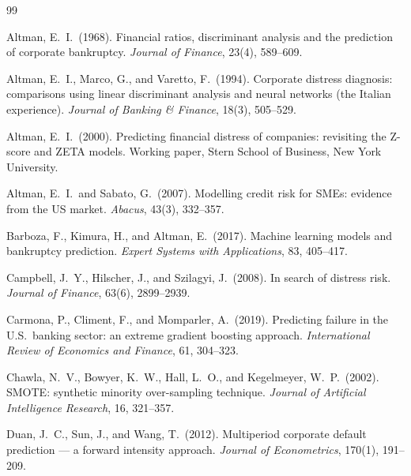 \documentclass[11pt,a4paper]{article}
\begin{document}

\begin{thebibliography}{99}

Altman, E.\ I.\ (1968).
\newblock Financial ratios, discriminant analysis and the prediction of
corporate bankruptcy.
\newblock \textit{Journal of Finance}, 23(4), 589--609.

Altman, E.\ I., Marco, G., and Varetto, F.\ (1994).
\newblock Corporate distress diagnosis: comparisons using linear discriminant
analysis and neural networks (the Italian experience).
\newblock \textit{Journal of Banking \& Finance}, 18(3), 505--529.

Altman, E.\ I.\ (2000).
\newblock Predicting financial distress of companies: revisiting the Z-score
and ZETA models.
\newblock Working paper, Stern School of Business, New York University.

Altman, E.\ I.\ and Sabato, G.\ (2007).
\newblock Modelling credit risk for SMEs: evidence from the US market.
\newblock \textit{Abacus}, 43(3), 332--357.

Barboza, F., Kimura, H., and Altman, E.\ (2017).
\newblock Machine learning models and bankruptcy prediction.
\newblock \textit{Expert Systems with Applications}, 83, 405--417.

Campbell, J.\ Y., Hilscher, J., and Szilagyi, J.\ (2008).
\newblock In search of distress risk.
\newblock \textit{Journal of Finance}, 63(6), 2899--2939.

Carmona, P., Climent, F., and Momparler, A.\ (2019).
\newblock Predicting failure in the U.S.\ banking sector: an extreme gradient
boosting approach.
\newblock \textit{International Review of Economics and Finance}, 61,
304--323.

Chawla, N.\ V., Bowyer, K.\ W., Hall, L.\ O., and Kegelmeyer, W.\ P.\ (2002).
\newblock SMOTE: synthetic minority over-sampling technique.
\newblock \textit{Journal of Artificial Intelligence Research}, 16, 321--357.

Duan, J.\ C., Sun, J., and Wang, T.\ (2012).
\newblock Multiperiod corporate default prediction --- a forward intensity
approach.
\newblock \textit{Journal of Econometrics}, 170(1), 191--209.


\end{thebibliography}
\end{document}
